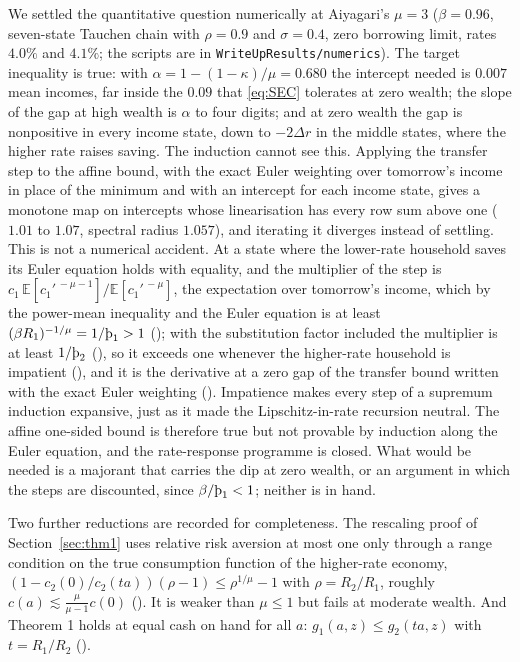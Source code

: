 We settled the quantitative question numerically at Aiyagari's $\mu=3$ ($\beta=0.96$, seven-state
Tauchen chain with $\rho=0.9$ and $\sigma=0.4$, zero borrowing limit, rates $4.0\%$ and $4.1\%$;
the scripts are in \texttt{WriteUpResults/\allowbreak numerics}). The target inequality is true:
with $\alpha=1-(1-\kappa)/\mu=0.680$ the intercept needed is $0.007$ mean incomes, far inside the
$0.09$ that \eqref{eq:SEC} tolerates at zero wealth; the slope of the gap at high wealth is
$\alpha$ to four digits; and at zero wealth the gap is nonpositive in every income state, down to
$-2\Delta r$ in the middle states, where the higher rate raises saving. The induction cannot see
this. Applying the transfer step to the affine bound, with the exact Euler weighting over
tomorrow's income in place of the minimum and with an intercept for each income state, gives a
monotone map on intercepts whose linearisation has every row sum above one ($1.01$ to $1.07$,
spectral radius $1.057$), and iterating it diverges instead of settling. This is not a numerical
accident. At a state where the lower-rate household saves its Euler equation holds with equality,
and the multiplier of the step is $c_1\,\mathbb{E}[c_1'^{\,-\mu-1}]/\mathbb{E}[c_1'^{\,-\mu}]$,
the expectation over tomorrow's income, which by the power-mean inequality and the Euler equation
is at least $(\beta R_1)^{-1/\mu}=1/\Thorn_1>1$ (); with the
substitution factor included the multiplier is at least $1/\Thorn_2$
(), so it exceeds one whenever the higher-rate household is
impatient (), and it is the derivative at a zero gap of the
transfer bound written with the exact Euler weighting ().
Impatience makes every step of a supremum induction expansive, just as it made the
Lipschitz-in-rate recursion neutral. The affine one-sided bound is therefore true but not
provable by induction along the Euler equation, and the rate-response programme is closed. What
would be needed is a majorant that carries the dip at zero wealth, or an argument in which the
steps are discounted, since $\beta/\Thorn_1<1$; neither is in hand.

Two further reductions are recorded for completeness. The rescaling proof of Section~\ref{sec:thm1}
uses relative risk aversion at most one only through a range condition on the true consumption
function of the higher-rate economy, $(1-c_2(0)/c_2(ta))(\rho-1)\le\rho^{1/\mu}-1$ with
$\rho=R_2/R_1$, roughly $c(a)\lesssim\frac{\mu}{\mu-1}c(0)$ ().
It is weaker than $\mu\le1$ but fails at moderate wealth. And Theorem 1 holds at equal cash on
hand for all $a$: $g_1(a,z)\le g_2(ta,z)$ with $t=R_1/R_2$ ().

